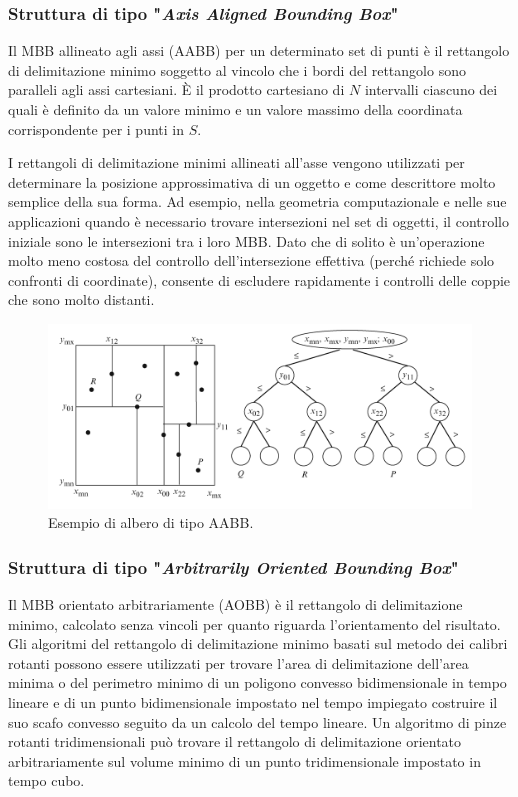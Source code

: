 \subsubsection{Struttura di tipo "\textit{Axis Aligned Bounding Box}"}
Il \ac{MBB} allineato agli assi (\ac{AABB}) per un determinato set di punti è il rettangolo di delimitazione minimo soggetto al vincolo che i bordi del rettangolo sono paralleli agli assi cartesiani. È il prodotto cartesiano di $N$ intervalli ciascuno dei quali è definito da un valore minimo e un valore massimo della coordinata corrispondente per i punti in $S$.

I rettangoli di delimitazione minimi allineati all'asse vengono utilizzati per determinare la posizione approssimativa di un oggetto e come descrittore molto semplice della sua forma. Ad esempio, nella geometria computazionale e nelle sue applicazioni quando è necessario trovare intersezioni nel set di oggetti, il controllo iniziale sono le intersezioni tra i loro \ac{MBB}. Dato che di solito è un'operazione molto meno costosa del controllo dell'intersezione effettiva (perché richiede solo confronti di coordinate), consente di escludere rapidamente i controlli delle coppie che sono molto distanti.

\begin{figure}[h]
	\centering
	\includegraphics[width=\linewidth]{Figures/AABB}
	\caption{Esempio di albero di tipo AABB.}
	\label{AABB}
\end{figure}
%
\subsubsection{Struttura di tipo "\textit{Arbitrarily Oriented Bounding Box}"}
Il \ac{MBB} orientato arbitrariamente (\ac{AOBB}) è il rettangolo di delimitazione minimo, calcolato senza vincoli per quanto riguarda l'orientamento del risultato. Gli algoritmi del rettangolo di delimitazione minimo basati sul metodo dei calibri rotanti possono essere utilizzati per trovare l'area di delimitazione dell'area minima o del perimetro minimo di un poligono convesso bidimensionale in tempo lineare e di un punto bidimensionale impostato nel tempo impiegato costruire il suo scafo convesso seguito da un calcolo del tempo lineare. Un algoritmo di pinze rotanti tridimensionali può trovare il rettangolo di delimitazione orientato arbitrariamente sul volume minimo di un punto tridimensionale impostato in tempo cubo.
%
